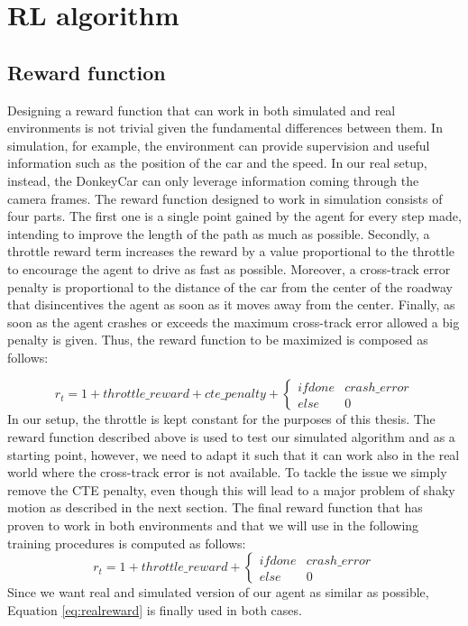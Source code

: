 \section{RL algorithm}

\subsection{Reward function}
Designing a reward function that can work in both simulated and real environments is not trivial given the fundamental differences between them. In simulation, for example, the environment can provide supervision and useful information such as the position of the car and the speed. In our real setup, instead, the DonkeyCar can only leverage information coming through the camera frames. The reward function designed to work in simulation consists of four parts. The first one is a single point gained by the agent for every step made, intending to improve the length of the path as much as possible. Secondly, a throttle reward term increases the reward by a value proportional to the throttle to encourage the agent to drive as fast as possible. Moreover, a cross-track error penalty is proportional to the distance of the car from the center of the roadway that disincentives the agent as soon as it moves away from the center. Finally, as soon as the agent crashes or exceeds the maximum cross-track error allowed a big penalty is given. Thus, the reward function to be maximized is composed as follows:

\begin{equation}
  \label{eq:stdreward}
    r_t = 1 + throttle\_reward + cte\_penalty + \left\{\begin{matrix}
    if done & crash\_error \\ 
    else & 0  
    \end{matrix}\right.
\end{equation}
In our setup, the throttle is kept constant for the purposes of this thesis.
The reward function described above is used to test our simulated algorithm and as a starting point, however, we need to adapt it such that it can work also in the real world where the cross-track error is not available. To tackle the issue we simply remove the CTE penalty, even though this will lead to a major problem of shaky motion as described in the next section. The final reward function that has proven to work in both environments and that we will use in the following training procedures is computed as follows:
\begin{equation}
  \label{eq:realreward}
    r_t = 1 + throttle\_reward + \left\{\begin{matrix}
    if done & crash\_error \\ 
    else & 0  
    \end{matrix}\right.
\end{equation}
Since we want real and simulated version of our agent as similar as possible, Equation \ref{eq:realreward} is finally used in both cases.

